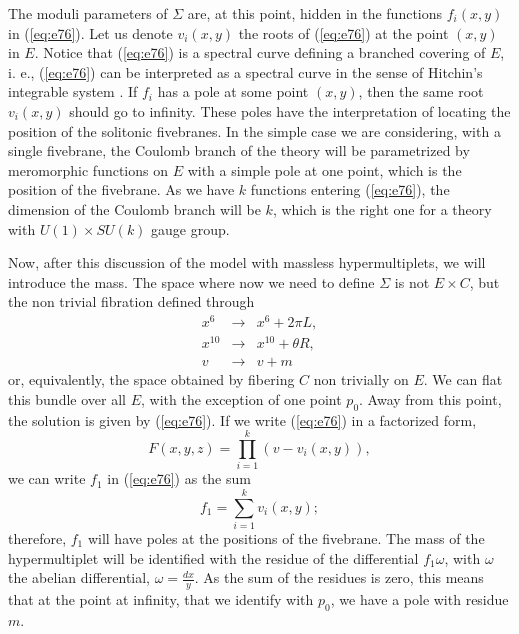 The moduli parameters of $\Sigma$ are, at this point, hidden in the functions 
$f_i(x,y)$ in (\ref{eq:e76}). Let us denote $v_i(x,y)$ the roots of (\ref{eq:e76}) 
at the point $(x,y)$ in $E$. Notice that (\ref{eq:e76}) is a spectral curve defining 
a branched covering of $E$, i. e., (\ref{eq:e76}) can be interpreted as a 
spectral curve in the sense of Hitchin's integrable system \cite{H}. If $f_i$ has a pole 
at some point $(x,y)$, then the same root $v_i(x,y)$ should go to infinity. These 
poles have the interpretation of locating the position of the solitonic 
fivebranes. In the simple case we are considering, with a single fivebrane, the 
Coulomb branch of the theory will be parametrized by meromorphic functions on $E$ 
with a simple pole at one point, which is the position of the fivebrane. As 
we have $k$ functions entering (\ref{eq:e76}), the dimension of the Coulomb 
branch will be $k$, which is the right one for a theory with $U(1)\times SU(k)$ 
gauge group. 
  
Now, after this discussion of the model with massless hypermultiplets, we 
will introduce the mass. The space where now we need to define $\Sigma$ is 
not $E \times C$, but the non trivial fibration defined through
\begin{eqnarray}
x^6 & \rightarrow & x^6 + 2 \pi L, \nonumber \\
x^{10} & \rightarrow & x^{10} + \theta R, \nonumber \\
v & \rightarrow & v + m
\label{eq:e77}
\end{eqnarray}
or, equivalently, the space obtained by fibering $C$ non trivially on $E$. We 
can flat this bundle over all $E$, with the exception of one point $p_0$. 
Away from this point, the solution is given by (\ref{eq:e76}). If we write 
(\ref{eq:e76}) in a factorized form,
\begin{equation}
F(x,y,z)=\prod_{i=1}^k(v-v_i(x,y)),
\label{eq:e78}
\end{equation}
we can write $f_1$ in (\ref{eq:e76}) as the sum
\begin{equation}
f_1 =\sum_{i=1}^k v_i(x,y);
\label{eq:e79}
\end{equation}
therefore, $f_1$ will have poles at the positions of the fivebrane. The mass 
of the hypermultiplet will be identified with the residue of the differential 
$f_1 \omega$, with $\omega$ the abelian differential, $\omega = \frac {dx}{y}$. As 
the sum of the residues is zero, this means that at the point at infinity, that 
we identify with $p_0$, we have a pole with residue $m$.


